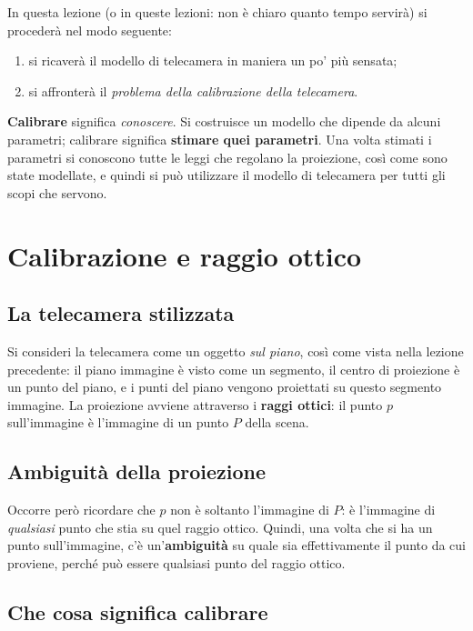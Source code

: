 In questa lezione (o in queste lezioni: non è chiaro quanto tempo servirà) si procederà nel modo seguente:
\begin{enumerate}[label=\arabic*.]
  \item si ricaverà il modello di telecamera in maniera un po' più sensata;
  \item si affronterà il \emph{problema della calibrazione della telecamera}.
\end{enumerate}

\textbf{Calibrare} significa \emph{conoscere}. Si costruisce un modello che dipende da alcuni parametri; calibrare significa \textbf{stimare quei parametri}. Una volta stimati i parametri si conoscono tutte le leggi che regolano la proiezione, così come sono state modellate, e quindi si può utilizzare il modello di telecamera per tutti gli scopi che servono.

\section{Calibrazione e raggio ottico}

\subsection{La telecamera stilizzata}

Si consideri la telecamera come un oggetto \emph{sul piano}, così come vista nella lezione precedente: il piano immagine è visto come un segmento, il centro di proiezione è un punto del piano, e i punti del piano vengono proiettati su questo segmento immagine. La proiezione avviene attraverso i \textbf{raggi ottici}: il punto $p$ sull'immagine è l'immagine di un punto $P$ della scena.

\subsection{Ambiguità della proiezione}

Occorre però ricordare che $p$ non è soltanto l'immagine di $P$: è l'immagine di \emph{qualsiasi} punto che stia su quel raggio ottico. Quindi, una volta che si ha un punto sull'immagine, c'è un'\textbf{ambiguità} su quale sia effettivamente il punto da cui proviene, perché può essere qualsiasi punto del raggio ottico.

\subsection{Che cosa significa calibrare}


